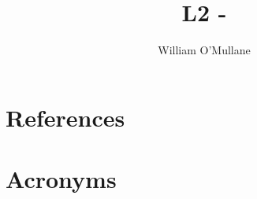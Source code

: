 \documentclass[OPS,authoryear,toc]{lsstdoc}
\title{L2 - \milestone}
\author{%
William O'Mullane
}
\date{\vcsDate}
\begin{document}
\maketitle



\appendix
\section{References} \label{sec:bib}
\renewcommand{\refname}{} %


\section{Acronyms} \label{sec:acronyms}

\end{document}
